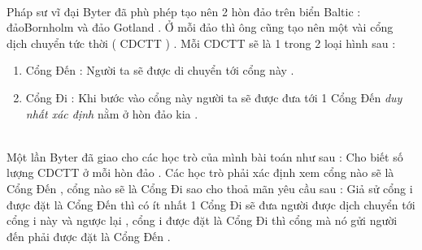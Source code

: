  

Pháp sư vĩ đại Byter đã phù phép tạo nên 2 hòn đảo trên biển Baltic : đảoBornholm và đảo Gotland . Ở mỗi đảo thì ông cũng tạo nên một vài cổng dịch chuyển tức thời ( CDCTT ) . Mỗi CDCTT sẽ là 1 trong 2 loại hình sau :
\begin{enumerate}
	\item Cổng Đến : Người ta sẽ được di chuyển tới cổng này .
	\item Cổng Đi : Khi bước vào cổng này người ta sẽ được đưa tới 1 Cổng Đến \emph{ duy nhất xác định } nằm ở hòn đảo kia .
\end{enumerate}


\\Một lần Byter đã giao cho các học trò của mình bài toán như sau : Cho biết số lượng CDCTT ở mỗi hòn đảo . Các học trò phải xác định xem cổng nào sẽ là Cổng Đến , cổng nào sẽ là Cổng Đi sao cho thoả mãn yêu cầu sau : Giả sử cổng i được đặt là Cổng Đến thì có ít nhất 1 Cổng Đi sẽ đưa người được dịch chuyển tới cổng i này và ngược lại , cổng i được đặt là Cổng Đi thì cổng mà nó gửi người đến phải được đặt là Cổng Đến .

\